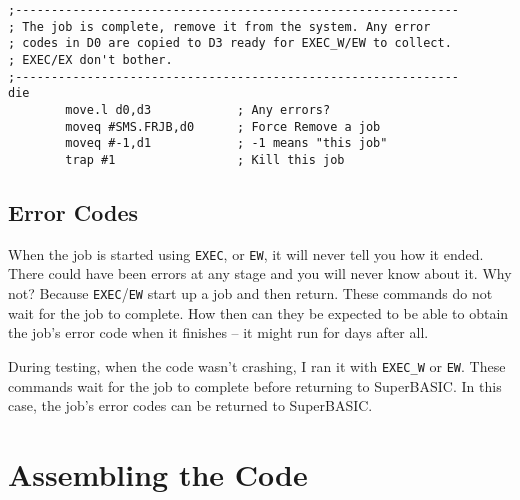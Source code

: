 \begin{lstlisting}[caption={Tinyfpga - Death of a Job},label={lis:Tinyfpga-Death-of-a-job}]
;--------------------------------------------------------------
; The job is complete, remove it from the system. Any error
; codes in D0 are copied to D3 ready for EXEC_W/EW to collect.
; EXEC/EX don't bother.
;--------------------------------------------------------------
die
        move.l d0,d3            ; Any errors?
        moveq #SMS.FRJB,d0      ; Force Remove a job
        moveq #-1,d1            ; -1 means "this job"
        trap #1                 ; Kill this job

\end{lstlisting}


\subsection{Error Codes}

When the job is started using \texttt{EXEC}, or \texttt{EW}, it will
never tell you how it ended. There could have been errors at any stage
and you will never know about it. Why not? Because \texttt{EXEC}/\texttt{EW}
start up a job and then return. These commands do not wait for the
job to complete. How then can they be expected to be able to obtain
the job's error code when it finishes -- it might run for days after
all.

During testing, when the code wasn't crashing, I ran it with \texttt{EXEC\_W}
or \texttt{EW}. These commands wait for the job to complete before
returning to SuperBASIC. In this case, the job's error codes can be
returned to SuperBASIC.

\section{Assembling the Code}

